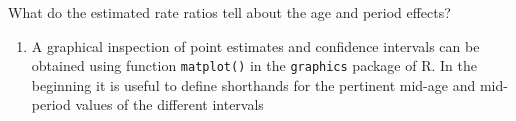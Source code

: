 \documentclass[
]{book}
\newenvironment{Shaded}{\begin{snugshade}}{\end{snugshade}}
\newcommand{\AttributeTok}[1]{\textcolor[rgb]{0.13,0.29,0.53}{#1}}
\newcommand{\DecValTok}[1]{\textcolor[rgb]{0.00,0.00,0.81}{#1}}
\newcommand{\FunctionTok}[1]{\textcolor[rgb]{0.13,0.29,0.53}{\textbf{#1}}}
\newcommand{\NormalTok}[1]{#1}
\newcommand{\OtherTok}[1]{\textcolor[rgb]{0.56,0.35,0.01}{#1}}
\newcommand{\SpecialCharTok}[1]{\textcolor[rgb]{0.81,0.36,0.00}{\textbf{#1}}}
\providecommand{\tightlist}{%
  \setlength{\itemsep}{0pt}\setlength{\parskip}{0pt}}
\begin{document}
\begin{Shaded}
\end{Shaded}

What do the estimated rate ratios tell about the age and period effects?

\begin{enumerate}
\def\labelenumi{\arabic{enumi}.}
\setcounter{enumi}{1}
\tightlist
\item
  A graphical inspection of point estimates and confidence intervals
  can be obtained using function \texttt{matplot()} in the \texttt{graphics} package
  of R. In the beginning it is useful to define shorthands for the
  pertinent mid-age and mid-period values of the different intervals
\end{enumerate}
\end{document}
